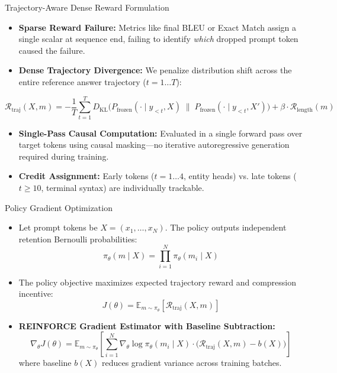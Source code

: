\documentclass[aspectratio=169,10pt]{beamer}
\begin{document}
\begin{frame}{Trajectory-Aware Dense Reward Formulation}
  \begin{itemize}
    \item \textbf{Sparse Reward Failure:} Metrics like final BLEU or Exact Match assign a single scalar at sequence end, failing to identify \emph{which} dropped prompt token caused the failure.
    \item \textbf{Dense Trajectory Divergence:} We penalize distribution shift across the entire reference answer trajectory ($t = 1 \dots T$):
  \end{itemize}
  \vspace{-0.2cm}
  $$\mathcal{R}_{\mathrm{traj}}(X, m) = - \frac{1}{T} \sum_{t=1}^T D_{\mathrm{KL}}\Big( P_{\mathrm{frozen}}(\cdot \mid y_{<t}, X) \;\parallel\; P_{\mathrm{frozen}}(\cdot \mid y_{<t}, X') \Big) + \beta \cdot \mathcal{R}_{\mathrm{length}}(m)$$
  \begin{itemize}
    \item \textbf{Single-Pass Causal Computation:} Evaluated in a single forward pass over target tokens using causal masking—no iterative autoregressive generation required during training.
    \item \textbf{Credit Assignment:} Early tokens ($t=1\dots 4$, entity heads) vs. late tokens ($t \ge 10$, terminal syntax) are individually trackable.
  \end{itemize}
\end{frame}

\begin{frame}{Policy Gradient Optimization}
  \begin{itemize}
    \item Let prompt tokens be $X = (x_1, \dots, x_N)$. The policy outputs independent retention Bernoulli probabilities:
    $$\pi_\theta(m \mid X) = \prod_{i=1}^N \pi_\theta(m_i \mid X)$$
    \item The policy objective maximizes expected trajectory reward and compression incentive:
    $$J(\theta) = \mathbb{E}_{m \sim \pi_\theta}\left[ \mathcal{R}_{\mathrm{traj}}(X, m) \right]$$
    \item \textbf{REINFORCE Gradient Estimator with Baseline Subtraction:}
    $$\nabla_\theta J(\theta) = \mathbb{E}_{m \sim \pi_\theta}\left[ \sum_{i=1}^N \nabla_\theta \log \pi_\theta(m_i \mid X) \cdot \big(\mathcal{R}_{\mathrm{traj}}(X, m) - b(X)\big) \right]$$
    where baseline $b(X)$ reduces gradient variance across training batches.
  \end{itemize}
\end{frame}
\end{document}
